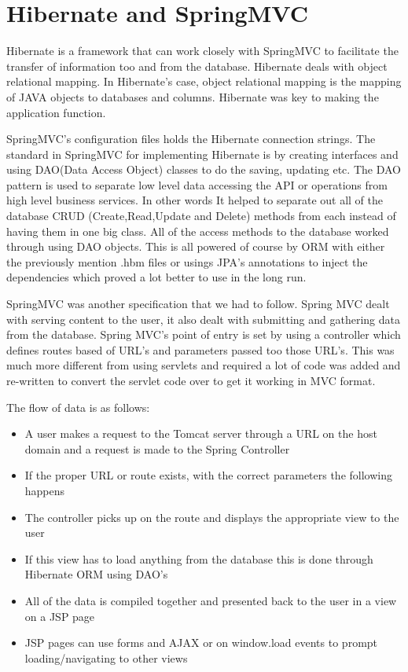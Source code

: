 \section{Hibernate and SpringMVC}

Hibernate is a framework that can work closely with SpringMVC to facilitate the transfer of information too and from the database. Hibernate deals with object relational mapping. In Hibernate's case, object relational mapping is the mapping of JAVA objects to databases and columns. Hibernate was key to making the application function. \newline 

\noindent SpringMVC's configuration files holds the Hibernate connection strings. The standard in SpringMVC for implementing Hibernate is by creating interfaces and using DAO(Data Access Object) classes to do the saving, updating etc. The DAO pattern is used to separate low level data accessing the API or operations from high level business services. In other words It helped to separate out all of the database CRUD (Create,Read,Update and Delete) methods from each instead of having them in one big class. All of the access methods to the database worked through using DAO objects. This is all powered of course by ORM with either the previously mention .hbm files or usings JPA's annotations to inject the dependencies which proved a lot better to use in the long run.\newline

\noindent SpringMVC was another specification that we had to follow. Spring MVC dealt with serving content to the user, it also dealt with submitting and gathering data from the database. Spring MVC's point of entry is set by using a controller which defines routes based of URL's and parameters passed too those URL's. This was much more different from using servlets and required a lot of code was added and re-written to convert the servlet code over to get it working in MVC format. \newline

\noindent The flow of data is as follows:

\begin{itemize}
	\item A user makes a request to the Tomcat server through a URL on the host domain and a request is made to the Spring Controller
	\item If the proper URL or route exists, with the correct parameters the following happens
	\item The controller picks up on the route and displays the appropriate view to the user
	\item If this view has to load anything from the database this is done through Hibernate ORM using DAO's
	\item All of the data is compiled together and presented back to the user in a view on a JSP page
	\item JSP pages can use forms and AJAX or on window.load events to prompt loading/navigating to other views
\end{itemize}

